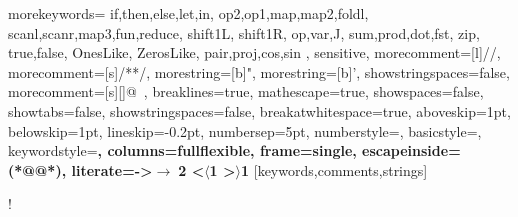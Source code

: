 \usepackage{todonotes}
\newcommand{\TODO}[1]{\todo[inline,author=TODO]{#1}}
\newcommand{\AS}[1]{\todo[inline,author=AS]{#1}}
\newcommand{\as}[1]{\todo[size=\tiny]{as: #1}{}}
\newcommand{\SSS}[1]{\todo[inline,author=SS]{#1}}
\newcommand{\sss}[1]{\todo[size=\tiny]{ss: #1}{}}
\newcommand{\EA}[1]{\todo[inline,author=EA]{#1}}
\newcommand{\ea}[1]{\todo[size=\tiny]{ea: #1}{}}
\newcommand{\MH}[1]{\todo[inline,author=MH]{#1}}
\newcommand{\mh}[1]{\todo[size=\tiny]{mh: #1}{}}
\newcommand{\YK}[1]{\todo[inline,author=YK]{#1}}
\newcommand{\yk}[1]{\todo[size=\tiny]{yk: #1}{}}

\usepackage{amsmath}
\usepackage{mathtools}
\usepackage{suffix}
\usepackage{tikz-cd}
\usepackage{mathpartir}
\usepackage{enumitem}
\usepackage{stmaryrd}
\usepackage[all]{xy}
\usepackage{twoopt}
\usepackage{array}
\usepackage{listings}
\usepackage{multirow, bigdelim}
\usepackage{graphicx}

%
{morekeywords={
  if,then,else,let,in,
  op2,op1,map,map2,foldl,
  scanl,scanr,map3,fun,reduce,
  shift1L, shift1R,
  op,var,J,
  sum,prod,dot,fst,
  zip,
  true,false,
  OnesLike,
  ZerosLike,
  pair,proj,cos,sin
  },%
  sensitive,%
  morecomment=[l]//,%
  morecomment=[s]{/*}{*/},%
  morestring=[b]",%
  morestring=[b]',%
  showstringspaces=false,%
  morecomment=[s][\color{gray}]{@}{\ },%
    breaklines=true,%
  mathescape=true,%
showspaces=false,
showtabs=false,
showstringspaces=false,
breakatwhitespace=true,
  aboveskip=1pt,
  belowskip=1pt,
  lineskip=-0.2pt,
  numbersep=5pt,
  numberstyle=\tiny\ttfamily,
  basicstyle=\small\ttfamily,
  keywordstyle=\bfseries\color{blue!70!black},%
  columns=fullflexible,
  frame=single,
  escapeinside={(*@}{@*)},
  literate={->}{$\rightarrow\;$}{2}
           {<}{$\langle$}{1}
           {>}{$\rangle$}{1}
}[keywords,comments,strings]%

\lstset{language=llql}
\lstMakeShortInline[columns=fixed]!

\newenvironment{absolutelynopagebreak}
  {\par\nobreak\vfil\penalty0\vfilneg
   \vtop\bgroup}
  {\par\xdef\tpd{\the\prevdepth}\egroup
   \prevdepth=\tpd}

\DeclareMathOperator{\J}{J}
\newcommand{\system}{RAD\xspace}
\newcommand{\dfsmooth}{$\text{d}\widetilde{\textsc{f}}$\xspace}
\newcommand{\supfull}{\CIRCLE}
\newcommand{\suphalf}{\LEFTcircle}
\newcommand{\supnone}{\Circle}
\newcommand{\supfullstar}{\hspace{1ex}\supfull*}
\newcommand{\notexists}{-}
\newcommand{\RR}{\mathbb{R}}

